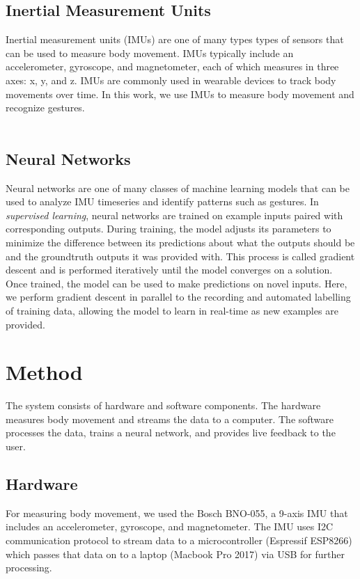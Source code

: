 \documentclass{nime-alternate} %
\begin{document}
\subsection{Inertial Measurement Units}
Inertial measurement units (IMUs) are one of many types types of sensors that can be used to measure body movement. IMUs typically include an accelerometer, gyroscope, and magnetometer, each of which measures in three axes: x, y, and z. IMUs are commonly used in wearable devices to track body movements over time. In this work, we use IMUs to measure body movement and recognize gestures.\\\\

\subsection{Neural Networks}
Neural networks are one of many classes of machine learning models that can be used to analyze IMU timeseries and identify patterns such as gestures. In \textit{supervised learning}, neural networks are trained on example inputs paired with corresponding outputs. During training, the model adjusts its parameters to minimize the difference between its predictions about what the outputs should be and the groundtruth outputs it was provided with. This process is called gradient descent and is performed iteratively until the model converges on a solution. Once trained, the model can be used to make predictions on novel inputs. Here, we perform gradient descent in parallel to the recording and automated labelling of training data, allowing the model to learn in real-time as new examples are provided.

\section{Method}
The system consists of hardware and software components. The hardware measures body movement and streams the data to a computer. The software processes the data, trains a neural network, and provides live feedback to the user. 

\subsection{Hardware}
For measuring body movement, we used the Bosch BNO-055, a 9-axis IMU that includes an accelerometer, gyroscope, and magnetometer. The IMU uses I2C communication protocol to stream data to a microcontroller (Espressif ESP8266) which passes that data on to a laptop  (Macbook Pro 2017) via USB for further processing.
\end{document}

